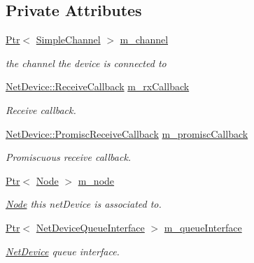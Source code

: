 \subsection*{Private Attributes}
\begin{DoxyCompactItemize}
\item 
\hyperlink{classns3_1_1Ptr}{Ptr}$<$ \hyperlink{classns3_1_1SimpleChannel}{Simple\+Channel} $>$ \hyperlink{classns3_1_1SimpleNetDevice_aac80c92fff8c2a189c1186d8d41a4808}{m\+\_\+channel}
\begin{DoxyCompactList}\small\item\em the channel the device is connected to \end{DoxyCompactList}\item 
\hyperlink{classns3_1_1NetDevice_ad5e5e1ca187472bc2ba99575d8def568}{Net\+Device\+::\+Receive\+Callback} \hyperlink{classns3_1_1SimpleNetDevice_a4e05eb44dc92b79880d7b2f9d7080afb}{m\+\_\+rx\+Callback}
\begin{DoxyCompactList}\small\item\em Receive callback. \end{DoxyCompactList}\item 
\hyperlink{classns3_1_1NetDevice_a427225795919f26c414bee2ea3f31ed2}{Net\+Device\+::\+Promisc\+Receive\+Callback} \hyperlink{classns3_1_1SimpleNetDevice_ad791745401d21961805c25572ccd7458}{m\+\_\+promisc\+Callback}
\begin{DoxyCompactList}\small\item\em Promiscuous receive callback. \end{DoxyCompactList}\item 
\hyperlink{classns3_1_1Ptr}{Ptr}$<$ \hyperlink{classns3_1_1Node}{Node} $>$ \hyperlink{classns3_1_1SimpleNetDevice_abf59768bbf6b40baef7d8dd6ed6028be}{m\+\_\+node}
\begin{DoxyCompactList}\small\item\em \hyperlink{classns3_1_1Node}{Node} this net\+Device is associated to. \end{DoxyCompactList}\item 
\hyperlink{classns3_1_1Ptr}{Ptr}$<$ \hyperlink{classns3_1_1NetDeviceQueueInterface}{Net\+Device\+Queue\+Interface} $>$ \hyperlink{classns3_1_1SimpleNetDevice_a35bd6983512fe87988362fa02f6425e7}{m\+\_\+queue\+Interface}
\begin{DoxyCompactList}\small\item\em \hyperlink{classns3_1_1NetDevice}{Net\+Device} queue interface. \end{DoxyCompactList}\item 

\end{DoxyCompactItemize}
